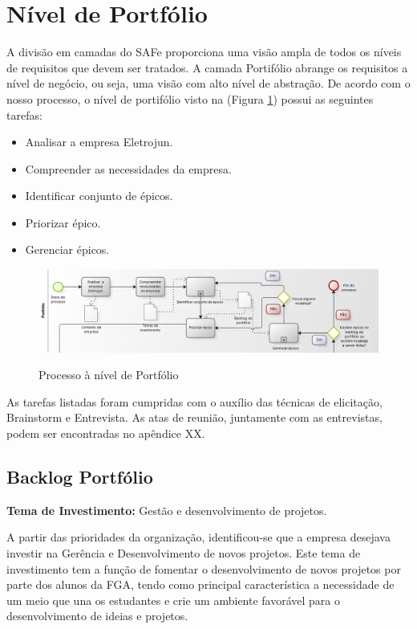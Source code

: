 \section {Nível de Portfólio}

A divisão em camadas do SAFe proporciona uma visão ampla de todos os níveis de requisitos que devem ser tratados. A camada Portifólio abrange os requisitos a nível de negócio, ou seja, uma visão com alto nível de abstração. De acordo com o nosso processo, o nível de portifólio visto na (Figura \ref{img:portfolio}) possui as seguintes tarefas:

\begin{itemize}
\item Analisar a empresa Eletrojun.
\item Compreender as necessidades da empresa.
\item Identificar conjunto de épicos.
\item Priorizar épico.
\item Gerenciar épicos.
\end{itemize}

\FloatBarrier
\begin{figure}[!htpd]
		\centering
		\includegraphics[scale=0.4]{figuras/portfolio}
		\label{img:portfolio}
		\caption{Processo à nível de Portfólio}
\end{figure}
\FloatBarrier

As tarefas listadas foram cumpridas com o auxílio das técnicas de elicitação, Brainstorm e Entrevista. As atas de reunião, juntamente com as entrevistas, podem ser encontradas no apêndice XX.

\subsection {Backlog Portfólio}

\textbf{Tema de Investimento:} Gestão e desenvolvimento de projetos.

 A partir das prioridades da organização, identificou-se que a empresa desejava investir na Gerência e Desenvolvimento de novos projetos. Este tema de investimento tem a função de fomentar o desenvolvimento de novos projetos por parte dos alunos da FGA, tendo como principal característica a necessidade de um meio que una os estudantes e crie um ambiente favorável para o desenvolvimento de ideias e projetos.

